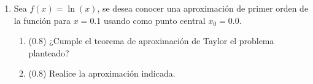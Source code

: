 \documentclass[12pt]{article}
\begin{document}
\begin{enumerate}[leftmargin=*,widest=9]
   \item Sea \(f(x) = \ln(x)\), se desea conocer una aproximación de primer orden de la función para \(x=0.1\) usando como punto central \(x_0=0.0\).

   \begin{enumerate}[label=\alph*]
    \item (\(0.8\)) ¿Cumple el teorema de aproximación de Taylor el problema planteado?
\vspace{3cm}

\item (\(0.8\)) Realice la aproximación indicada.
\vspace{3cm}
  \end{enumerate}
\end{enumerate}
\end{document}
